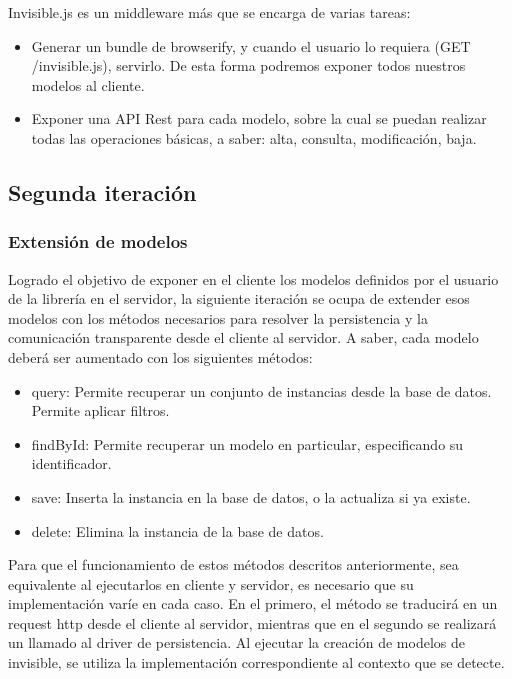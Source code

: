 \documentclass[doc,helv,longtable]{article}
\begin{document}
Invisible.js es un middleware más que se encarga de varias tareas:
\begin{itemize}
\item  Generar un bundle de browserify, y cuando el usuario lo requiera (GET /invisible.js), servirlo. De esta forma podremos exponer todos nuestros modelos al cliente.
\item  Exponer una API Rest para cada modelo, sobre la cual se puedan realizar todas las operaciones básicas, a saber: alta, consulta, modificación, baja. 

\end{itemize}
\subsection{Segunda iteración}
\subsubsection{Extensión de modelos}


Logrado el objetivo de exponer en el cliente los modelos definidos por el usuario de la librería en el servidor, la siguiente iteración se ocupa de extender esos modelos con los métodos necesarios para resolver la persistencia y la comunicación transparente desde el cliente al servidor. A saber, cada modelo deberá ser aumentado con los siguientes métodos:
\begin{itemize}
\item  query: Permite recuperar un conjunto de instancias desde la base de datos. Permite aplicar filtros.
\item  findById: Permite recuperar un modelo en particular, especificando su identificador.
\item  save: Inserta la instancia en la base de datos, o la actualiza si ya existe.
\item  delete: Elimina la instancia de la base de datos.

\end{itemize}


Para que el funcionamiento de estos métodos descritos anteriormente, sea equivalente al ejecutarlos en cliente y servidor, es necesario que su implementación varíe en cada caso. En el primero, el método se traducirá en un request http desde el cliente al servidor, mientras que en el segundo se realizará un llamado al driver de persistencia. Al ejecutar la creación de modelos de invisible, se utiliza la implementación correspondiente al contexto que se detecte.
\end{document}
